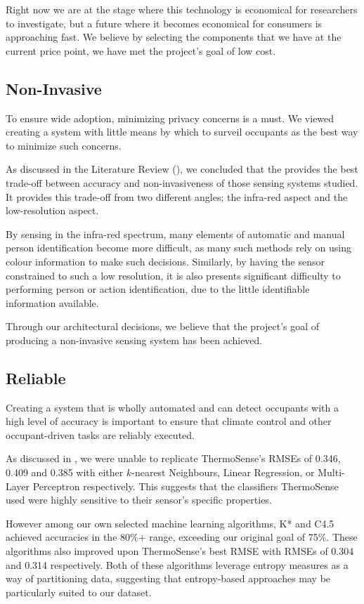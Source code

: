 \documentclass[../thesis/thesis.tex]{subfiles}
\begin{document}
Right now we are at the stage where this technology is economical for researchers to investigate, but a future where it becomes economical for consumers is approaching fast. We believe by selecting the components that we have at the current price point, we have met the project's goal of low cost.

\subsection{Non-Invasive}
To ensure wide adoption, minimizing privacy concerns is a must. We viewed creating a system with little means by which to  surveil occupants as the best way to minimize such concerns.

As discussed in the Literature Review (), we concluded that the \mlx provides the best trade-off between accuracy and non-invasiveness of those sensing systems studied. It provides this trade-off from two different angles; the infra-red aspect and the low-resolution aspect. 

By sensing in the infra-red spectrum, many elements of automatic and manual person identification become more difficult, as many such methods rely on using colour information to make such decisions. Similarly, by having the sensor constrained to such a low resolution, it is also presents significant difficulty to performing person or action identification, due to the little identifiable information available.

Through our architectural decisions, we believe that the project's goal of producing a non-invasive sensing system has been achieved.

\subsection{Reliable}
Creating a system that is wholly automated and can detect occupants with a high level of accuracy is important to ensure that climate control and other occupant-driven tasks are reliably executed.

As discussed in , we were unable to replicate ThermoSense's RMSEs of 0.346, 0.409 and 0.385 with either $k$-nearest Neighbours, Linear Regression, or Multi-Layer Perceptron respectively. This suggests that the classifiers ThermoSense used were highly sensitive to their sensor's specific properties.

However among our own selected machine learning algorithms, K* and C4.5 achieved accuracies in the 80\%+ range, exceeding our original goal of 75\%. These algorithms also improved upon ThermoSense's best RMSE with RMSEs of 0.304 and 0.314 respectively. Both of these algorithms leverage entropy measures as a way of partitioning data, suggesting that entropy-based approaches may be particularly suited to our dataset.
\end{document}
